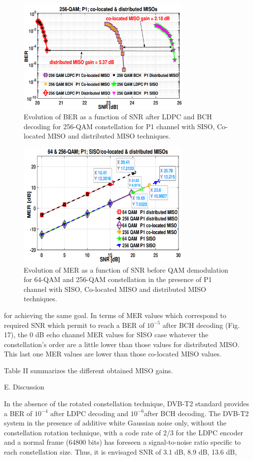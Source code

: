 \documentclass[10pt, conference]{IEEEtran}
\begin{document}
\linespread{1}
\begin{figure}[!htbp]
\centering
\includegraphics[width=8.5cm]{img3.png}
    \caption{ Evolution of BER as a function of SNR after LDPC and BCH decoding for 256-QAM constellation for P1 channel with SISO, Co-located MISO and distributed MISO techniques.}
\end{figure}

\begin{figure}[!htbp]
\centering
\includegraphics[width=8.5cm]{img4.png}
    \caption{Evolution of MER as a function of SNR before QAM demodulation for 64-QAM and 256-QAM constellation in the presence of P1 channel with SISO, Co-located MISO and distributed MISO techniques.}
\end{figure}

\normalsize{
for achieving the same goal. In terms of MER values which correspond to required SNR which permit to reach a BER of $10^{-5}$ after BCH decoding (Fig. 17), the 0 dB echo channel MER values for SISO case whatever the constellation’s order are a little lower than those values for distributed MISO. This last one MER values are lower than those co-located MISO values. 

Table II summarizes the different obtained MISO gains.

E. Discussion

In the absence of the rotated constellation technique, DVB-T2 standard provides a BER of $10^{-4}$ after LDPC decoding and $10^{-6}$after BCH decoding. The DVB-T2 system in the presence of additive white Gaussian noise only, without the constellation rotation technique, with a code rate of 2/3 for the LDPC encoder and a normal frame (64800 bits) has foreseen a signal-to-noise ratio specific to each constellation size. Thus, it is envisaged SNR of 3.1 dB, 8.9 dB, 13.6 dB,
}
\end{document}
